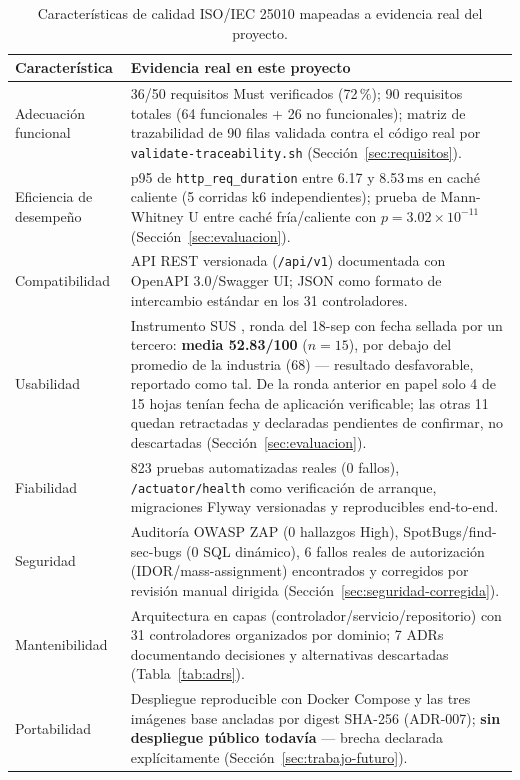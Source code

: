 \begin{table}[H]
\centering
\small
\begin{tabular}{p{2.6cm}p{9.5cm}}
\toprule
\textbf{Característica} & \textbf{Evidencia real en este proyecto} \\
\midrule
Adecuación funcional & 36/50 requisitos Must verificados (72\,\%); 90 requisitos totales (64
funcionales + 26 no funcionales); matriz de trazabilidad de 90 filas validada contra el código real por
\texttt{validate-traceability.sh} (Sección~\ref{sec:requisitos}). \\
Eficiencia de desempeño & p95 de \texttt{http\_req\_duration} entre 6.17 y 8.53\,ms en caché caliente
(5 corridas k6 independientes); prueba de Mann-Whitney U entre caché fría/caliente con
$p = 3.02\times10^{-11}$ (Sección~\ref{sec:evaluacion}). \\
Compatibilidad & API REST versionada (\texttt{/api/v1}) documentada con OpenAPI 3.0/Swagger UI; JSON como
formato de intercambio estándar en los 31 controladores. \\
Usabilidad & Instrumento SUS \cite{brooke1996}, ronda del 18-sep con fecha sellada por un tercero:
\textbf{media 52.83/100} ($n=15$), por debajo del promedio de la industria (68) --- resultado
desfavorable, reportado como tal. De la ronda anterior en papel solo 4 de 15 hojas tenían fecha de
aplicación verificable; las otras 11 quedan retractadas y declaradas pendientes de confirmar, no
descartadas (Sección~\ref{sec:evaluacion}). \\
Fiabilidad & 823 pruebas automatizadas reales (0 fallos), \texttt{/actuator/health} como verificación de
arranque, migraciones Flyway versionadas y reproducibles end-to-end. \\
Seguridad & Auditoría OWASP ZAP (0 hallazgos High), SpotBugs/find-sec-bugs (0 SQL dinámico), 6 fallos
reales de autorización (IDOR/mass-assignment) encontrados y corregidos por revisión manual dirigida
(Sección~\ref{sec:seguridad-corregida}). \\
Mantenibilidad & Arquitectura en capas (controlador/servicio/repositorio) con 31 controladores
organizados por dominio; 7 ADRs documentando decisiones y alternativas descartadas (Tabla~\ref{tab:adrs}). \\
Portabilidad & Despliegue reproducible con Docker Compose y las tres imágenes base ancladas por digest
SHA-256 (ADR-007); \textbf{sin despliegue público todavía} --- brecha declarada explícitamente
(Sección~\ref{sec:trabajo-futuro}). \\
\bottomrule
\end{tabular}
\caption{Características de calidad ISO/IEC 25010 mapeadas a evidencia real del proyecto.}
\label{tab:iso25010}
\end{table}

